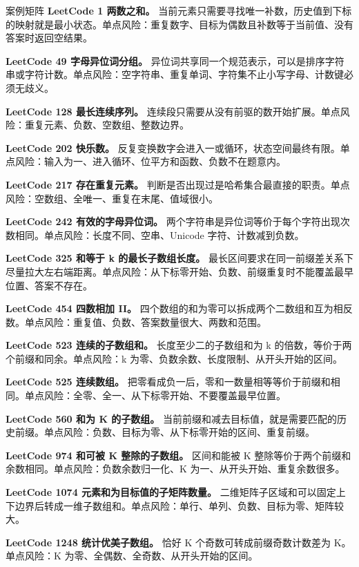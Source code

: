 \begin{principlebox}{案例矩阵}
\textbf{LeetCode 1 两数之和。}
当前元素只需要寻找唯一补数，历史值到下标的映射就是最小状态。单点风险：重复数字、目标为偶数且补数等于当前值、没有答案时返回空结果。

\textbf{LeetCode 49 字母异位词分组。}
异位词共享同一个规范表示，可以是排序字符串或字符计数。单点风险：空字符串、重复单词、字符集不止小写字母、计数键必须无歧义。

\textbf{LeetCode 128 最长连续序列。}
连续段只需要从没有前驱的数开始扩展。单点风险：重复元素、负数、空数组、整数边界。

\textbf{LeetCode 202 快乐数。}
反复变换数字会进入一或循环，状态空间最终有限。单点风险：输入为一、进入循环、位平方和函数、负数不在题意内。

\textbf{LeetCode 217 存在重复元素。}
判断是否出现过是哈希集合最直接的职责。单点风险：空数组、全唯一、重复在末尾、值域很小。

\textbf{LeetCode 242 有效的字母异位词。}
两个字符串是异位词等价于每个字符出现次数相同。单点风险：长度不同、空串、Unicode 字符、计数减到负数。

\textbf{LeetCode 325 和等于 k 的最长子数组长度。}
最长区间要求在同一前缀差关系下尽量拉大左右端距离。单点风险：从下标零开始、负数、前缀重复时不能覆盖最早位置、答案不存在。

\textbf{LeetCode 454 四数相加 II。}
四个数组的和为零可以拆成两个二数组和互为相反数。单点风险：重复值、负数、答案数量很大、两数和范围。

\textbf{LeetCode 523 连续的子数组和。}
长度至少二的子数组和为 k 的倍数，等价于两个前缀和同余。单点风险：k 为零、负数余数、长度限制、从开头开始的区间。

\textbf{LeetCode 525 连续数组。}
把零看成负一后，零和一数量相等等价于前缀和相同。单点风险：全零、全一、从下标零开始、不要覆盖最早位置。

\textbf{LeetCode 560 和为 K 的子数组。}
当前前缀和减去目标值，就是需要匹配的历史前缀。单点风险：负数、目标为零、从下标零开始的区间、重复前缀。

\textbf{LeetCode 974 和可被 K 整除的子数组。}
区间和能被 K 整除等价于两个前缀和余数相同。单点风险：负数余数归一化、K 为一、从开头开始、重复余数很多。

\textbf{LeetCode 1074 元素和为目标值的子矩阵数量。}
二维矩阵子区域和可以固定上下边界后转成一维子数组和。单点风险：单行、单列、负数、目标为零、矩阵较大。

\textbf{LeetCode 1248 统计优美子数组。}
恰好 K 个奇数可转成前缀奇数计数差为 K。单点风险：K 为零、全偶数、全奇数、从开头开始的区间。

\end{principlebox}

